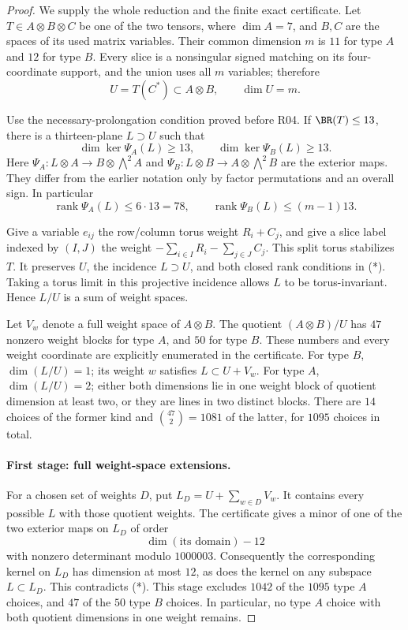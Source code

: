 \begin{proof}
We supply the whole reduction and the finite exact certificate.
Let \(T\in A\otimes B\otimes C\) be one of the two tensors,
where \(\dim A=7\), and \(B,C\) are the spaces of its used
matrix variables. Their common dimension \(m\) is \(11\)
for type \(A\) and \(12\) for type \(B\). Every slice is a
nonsingular signed matching on its four-coordinate support,
and the union uses all \(m\) variables; therefore
\[
 U=T(C^*)\subset A\otimes B,\qquad \dim U=m.
\]

Use the necessary-prolongation condition proved before R04.
If \(\BR(T)\leq13\), there is a thirteen-plane
\(L\supset U\) such that
\[
 \dim\ker\Psi_A(L)\geq13,\qquad
 \dim\ker\Psi_B(L)\geq13.
 \tag{*}
\]
Here \(\Psi_A:L\otimes A\to B\otimes\bigwedge^2A\) and
\(\Psi_B:L\otimes B\to A\otimes\bigwedge^2B\) are the
exterior maps. They differ from the earlier notation only
by factor permutations and an overall sign. In particular
\[
 \operatorname{rank}\Psi_A(L)\leq6\cdot13=78,\qquad
 \operatorname{rank}\Psi_B(L)\leq(m-1)13.
 \tag{**}
\]

Give a variable \(e_{ij}\) the row/column torus weight
\(R_i+C_j\), and give a slice label indexed by \((I,J)\)
the weight \(-\sum_{i\in I}R_i-\sum_{j\in J}C_j\).
This split torus stabilizes \(T\). It preserves \(U\), the
incidence \(L\supset U\), and both closed rank conditions
in (*). Taking a torus limit in this projective incidence
allows \(L\) to be torus-invariant. Hence \(L/U\) is a sum
of weight spaces.

Let \(V_w\) denote a full weight space of \(A\otimes B\).
The quotient \((A\otimes B)/U\) has \(47\) nonzero weight
blocks for type \(A\), and \(50\) for type \(B\).
These numbers and every weight coordinate are explicitly
enumerated in the certificate. For type \(B\),
\(\dim(L/U)=1\); its weight \(w\) satisfies
\(L\subset U+V_w\). For type \(A\),
\(\dim(L/U)=2\); either both dimensions lie in one weight
block of quotient dimension at least two, or they are
lines in two distinct blocks. There are \(14\) choices
of the former kind and \(\binom{47}{2}=1081\) of the
latter, for \(1095\) choices in total.

\paragraph{First stage: full weight-space extensions.}
For a chosen set of weights \(D\), put
\(L_D=U+\sum_{w\in D}V_w\). It contains every possible
\(L\) with those quotient weights. The certificate gives
a minor of one of the two exterior maps on \(L_D\)
of order
\[
 \dim(\text{its domain})-12
\]
with nonzero determinant modulo \(1000003\).
Consequently the corresponding kernel on \(L_D\) has
dimension at most \(12\), as does the kernel on any
subspace \(L\subset L_D\). This contradicts (*).
This stage excludes \(1042\) of the \(1095\) type \(A\)
choices, and \(47\) of the \(50\) type \(B\) choices.
In particular, no type \(A\) choice with both quotient
dimensions in one weight remains.


\end{proof}
